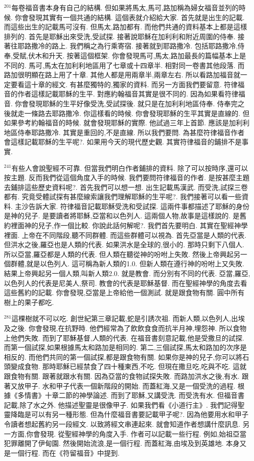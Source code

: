 \documentclass{book}
\begin{document}
$^{201}$每卷福音書本身有自己的結構.
但如果將馬太,馬可,路加稱為婦女福音並列的時候.
你會發現其實有一個共通的結構.
這個表就介紹給大家.
首先就是出生的記載.
而這些出生的記載馬可沒有.
但馬太,路加都有.
而他們共通的資料基本上都是這樣排列的.
首先是耶穌出來受洗,受試探.
接著說耶穌在加利利和附近周圍的侍奉.
接著往耶路撒冷的路上.
我們稱之為行乘寄宿.
接著就到耶路撒冷.
包括耶路撒冷,侍奉,受賦,伏木和升天.
按著這個框架.
你會發現馬可,馬太,路加最長的篇幅基本上是不同的.
馬可,馬太在加利利地區用了七章或十四章半.
相對同一卷書其他段落.
而路加很明顯在路上用了十章.
其他人都是用兩章半,兩章左右.
所以看路加福音就一定要看這十章的經文.
有甚麼獨特的,獨家的資料.
而另一方面我們要留意.
符律福音的作者這樣記載耶穌的生平.
對應約翰福音其實是很不同的.
因為如果看符律福音.
你會發現耶穌的生平好像受洗,受試探後.
就只是在加利利地區侍奉.
侍奉完之後就走一條路去耶路撒冷.
你這樣看的時候.
你會發現耶穌的生平其實是直線的.
但如果參考約翰福音的時候.
就會發現耶穌的實際.
他試過三年上首節.
應該是加利利地區侍奉耶路撒冷.
其實是重回的,不是直線.
所以我們要問.
為甚麼符律福音作者會這樣記載耶穌的生平呢?.
如果用今天的現代歷史觀.
其實符律福音的鋪排不是事實.

$^{241}$有些人會說聖經不可靠.
但當我們明白作者鋪排的資料.
除了可以按時序,還可以按主題.
反而我們從這個角度入手的時候.
我們要問符律福音的作者.
是按甚麼主題去鋪排這些歷史資料呢?.
首先我們可以想一想.
出生記載馬漢武.
而受洗,試探三卷都有.
究竟受體試探有甚麼線索讓我們理解耶穌的生平呢?.
我們接著可以看一些資料.
主沙告訴大家.
符律福音記載耶穌受洗和受試探.
這兩件事都描述了耶穌的身份是神的兒子.
是要讀者將耶穌,亞當和以色列人.
這兩個人物,故事是這樣說的.
是舊約裡面神的兒子,作一個比較.
你說此話何解呢?.
我們首先要明白.
其實在聖經神學裡面.
上帝在不同階段,聽不同群體.
而這些群體可以視為.
首先亞當是人類的代表.
但洪水之後,羅亞也是人類的代表.
如果洪水是全球的,很小的.
那時只剩下八個人.
所以亞當,羅亞都是人類的代表.
但人類在聽從神的吩咐上失敗.
然後上帝興起另一個群體,就是以色列人.
這可稱為新人類的1.0.
但新人類在遵行神的吩咐上又失敗.
結果上帝興起另一個人類,叫新人類2.0.
就是教會.
而分別有不同的代表.
亞當,羅亞,以色列人的代表是尼美人,祭司.
教會的代表是耶穌基督.
而在聖經神學的角度去看這些舊約的記載.
你會發現,亞當是上帝給他一個測試.
就是跟食物有關.
圓中所有樹上的果子都吃.

$^{281}$這棵樹就不可以吃.
創世紀第三章記載,蛇是引誘次祖.
而新人類,以色列人,出埃及之後.
你會發現,在抗野時.
他們經常為了飲飲食食而抗半月神,埋怨神.
所以食物上他們失敗.
而到了耶穌基督,人類的代表.
在福音書刻意記載,他是受撒旦的試探.
而第一個試探,如果根據馬太和路加是相同的.
第二,三個試探,馬太和路加的次序是相反的.
而他們共同的第一個試探,都是跟食物有關.
如果你是神的兒子,你可以將石頭變成食物.
那時耶穌已經禁食了四十種東西,不吃.
但現在撒旦吃,吃與不吃.
這就跟食物有關.
跟著就跟水有關.
因為亞當的食物試探失敗.
而路加洪水之後,有水.
跟著又放甲子.
水和甲子代表一個新階段的開始.
而蓋紅海,又是一個受洗的過程.
根據《多情書》十章二節的神學論述.
而到了耶穌,又講受洗.
而受洗有水.
但福音書記載,除了水之外.
他描述聖靈是很像甲子.
如果我們看《小道行主》.
我們記得聖靈降臨是可以有另一種形態.
但為什麼福音書要記載甲子呢?.
因為他要用水和甲子令讀者想起舊約另一段經文.
以致將經文串連起來.
就會知道作者想講什麼訊息.
另一方面,你會發現.
從聖經神學的角度入手.
作者可以記載一些行程.
例如,始祖亞當犯罪離開了伊甸園.
然後開始流浪,是一個行程.
而蓋紅海,由埃及到英雄地.
本身又是一個行程.
而在《符留福音》中提到.
\end{document}
